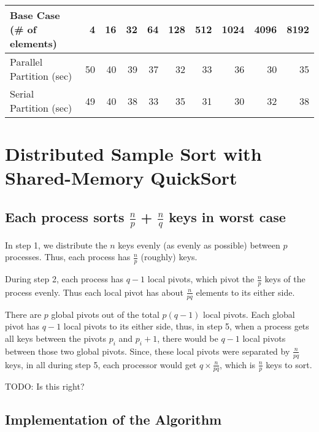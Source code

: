 \documentclass{article}
\begin{document}
\begin{center}
  \begin{tabular}{| l | r | r | r | r | r | r | r | r | r |}
    \hline
    Base Case (\# of elements) & 4 & 16 & 32 & 64 & 128 & 512 & 1024 & 4096 & 8192 \\ \hline
    Parallel Partition (sec) & 50 & 40 & 39 & 37 & 32 & 33 & 36 & 30 & 35 \\ \hline
    Serial Partition (sec) & 49 & 40 & 38 & 33 & 35 & 31 & 30 & 32 & 38 \\ \hline
  \end{tabular}
\end{center}


\section{Distributed Sample Sort with Shared-Memory QuickSort}

\subsection{Each process sorts $\frac{n}{p}$ + $\frac{n}{q}$ keys in worst case}
In step 1, we distribute the $n$ keys evenly (as evenly as possible)
between $p$ processes. Thus, each process has $\frac{n}{p}$ (roughly) keys.

During step 2, each process has $q-1$ local pivots, which pivot the 
$\frac{n}{p}$ keys of the process evenly. Thus each local pivot has 
about $\frac{n}{pq}$ elements to its either side. 

There are $p$ global pivots out of the total $p(q-1)$ local pivots.
Each global pivot has $q-1$ local pivots to its either side, thus, 
in step 5, when a process gets all keys between the pivots $p_i$ and 
$p_i+1$, there would be $q-1$ local pivots between those two global
pivots. Since, these local pivots were separated by 
$\frac{n}{pq}$ keys, in all during step 5, each processor would get
$q \times \frac{n}{pq}$, which is $\frac{n}{p}$ keys to sort.

TODO: Is this right?

\subsection{Implementation of the Algorithm}
\end{document}
